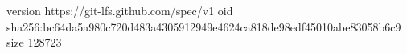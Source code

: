 version https://git-lfs.github.com/spec/v1
oid sha256:bc64da5a980c720d483a4305912949e4624ca818de98edf45010abe83058b6c9
size 128723
